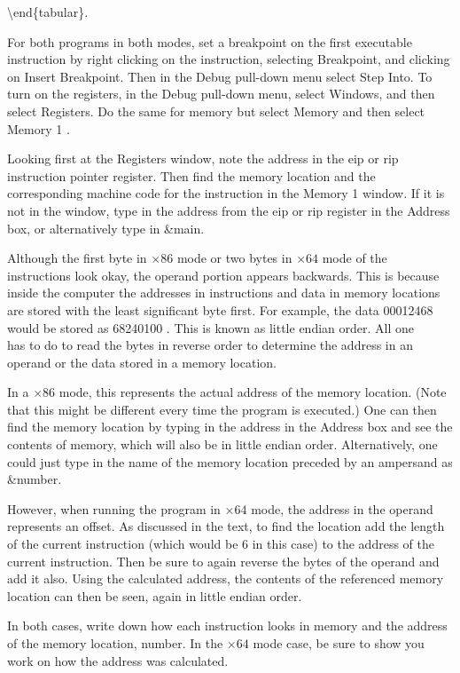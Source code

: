 \documentclass[10pt]{article}
\begin{document}
\textbackslash end\{tabular\}.

For both programs in both modes, set a breakpoint on the first executable instruction by right clicking on the instruction, selecting Breakpoint, and clicking on Insert Breakpoint. Then in the Debug pull-down menu select Step Into. To turn on the registers, in the Debug pull-down menu, select Windows, and then select Registers. Do the same for memory but select Memory and then select Memory 1 .

Looking first at the Registers window, note the address in the eip or rip instruction pointer register. Then find the memory location and the corresponding machine code for the instruction in the Memory 1 window. If it is not in the window, type in the address from the eip or rip register in the Address box, or alternatively type in \&main.

Although the first byte in $\times 86$ mode or two bytes in $\times 64$ mode of the instructions look okay, the operand portion appears backwards. This is because inside the computer the addresses in instructions and data in memory locations are stored with the least significant byte first. For example, the data 00012468 would be stored as 68240100 . This is known as little endian order. All one\\
has to do to read the bytes in reverse order to determine the address in an operand or the data stored in a memory location.

In a $\times 86$ mode, this represents the actual address of the memory location. (Note that this might be different every time the program is executed.) One can then find the memory location by typing in the address in the Address box and see the contents of memory, which will also be in little endian order. Alternatively, one could just type in the name of the memory location preceded by an ampersand as \&number.

However, when running the program in $\times 64$ mode, the address in the operand represents an offset. As discussed in the text, to find the location add the length of the current instruction (which would be 6 in this case) to the address of the current instruction. Then be sure to again reverse the bytes of the operand and add it also. Using the calculated address, the contents of the referenced memory location can then be seen, again in little endian order.

In both cases, write down how each instruction looks in memory and the address of the memory location, number. In the $\times 64$ mode case, be sure to show you work on how the address was calculated.
\end{document}
